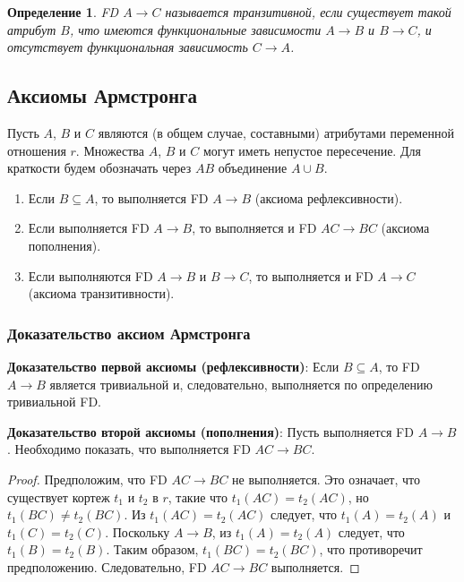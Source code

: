 \documentclass[a4paper,12pt]{article}
\newtheorem{definition}{Определение}
\begin{document}
\begin{definition}
    FD $A \rightarrow C$ называется транзитивной, если существует такой атрибут $B$, что имеются функциональные зависимости $A \rightarrow B$ и $B \rightarrow C$, и отсутствует функциональная зависимость $C \rightarrow A$.
\end{definition}

\subsection{Аксиомы Армстронга}

Пусть $A$, $B$ и $C$ являются (в общем случае, составными) атрибутами переменной отношения $r$. Множества $A$, $B$ и $C$ могут иметь непустое пересечение. Для краткости будем обозначать через $AB$ объединение $A \cup B$.

\begin{enumerate}
    \item Если $B \subseteq A$, то выполняется FD $A \rightarrow B$ (аксиома рефлексивности).
    \item Если выполняется FD $A \rightarrow B$, то выполняется и FD $AC \rightarrow BC$ (аксиома пополнения).
    \item Если выполняются FD $A \rightarrow B$ и $B \rightarrow C$, то выполняется и FD $A \rightarrow C$ (аксиома транзитивности).
\end{enumerate}

\subsubsection{Доказательство аксиом Армстронга}

\textbf{Доказательство первой аксиомы (рефлексивности)}: Если $B \subseteq A$, то FD $A \rightarrow B$ является тривиальной и, следовательно, выполняется по определению тривиальной FD.

\textbf{Доказательство второй аксиомы (пополнения)}: Пусть выполняется FD $A \rightarrow B$. Необходимо показать, что выполняется FD $AC \rightarrow BC$.
\begin{proof}
    Предположим, что FD $AC \rightarrow BC$ не выполняется. Это означает, что существует кортеж $t_1$ и $t_2$ в $r$, такие что $t_1(AC) = t_2(AC)$, но $t_1(BC) \neq t_2(BC)$. Из $t_1(AC) = t_2(AC)$ следует, что $t_1(A) = t_2(A)$ и $t_1(C) = t_2(C)$. Поскольку $A \rightarrow B$, из $t_1(A) = t_2(A)$ следует, что $t_1(B) = t_2(B)$. Таким образом, $t_1(BC) = t_2(BC)$, что противоречит предположению. Следовательно, FD $AC \rightarrow BC$ выполняется.
\end{proof}
\end{document}
